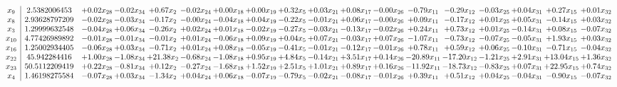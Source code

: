 \documentclass[9pt]{article}
\begin{document}
 \[\begin{array}{c| c c@{\hskip 2pt} c@{\hskip 2pt} c@{\hskip 2pt} c@{\hskip 2pt} c@{\hskip 2pt} c@{\hskip 2pt} c@{\hskip 2pt} c@{\hskip 2pt} c@{\hskip 2pt} c@{\hskip 2pt} c@{\hskip 2pt} c@{\hskip 2pt} c@{\hskip 2pt} c@{\hskip 2pt} c@{\hskip 2pt} c@{\hskip 2pt} }
 x_{9}   &  2.5382006453 & +  0.02 x_{28} & -0.02 x_{34} & +  0.67 x_{2} & -0.02 x_{24} & +  0.00 x_{18} & +  0.00 x_{19} & +  0.32 x_{5} & +  0.03 x_{21} & +  0.08 x_{17} & -0.00 x_{26} & -0.79 x_{11} & -0.29 x_{12} & -0.03 x_{25} & +  0.04 x_{31} & +  0.27 x_{15} & +  0.01 x_{32}\\
 x_{8}   &  2.93628797209 & -0.02 x_{28} & -0.03 x_{34} & -0.17 x_{2} & -0.00 x_{24} & -0.04 x_{18} & +  0.04 x_{19} & -0.22 x_{5} & -0.01 x_{21} & +  0.06 x_{17} & -0.00 x_{26} & +  0.09 x_{11} & -0.17 x_{12} & +  0.01 x_{25} & +  0.05 x_{31} & -0.14 x_{15} & +  0.03 x_{32}\\
 x_{3}   &  1.29999632548 & -0.04 x_{28} & +  0.06 x_{34} & -0.26 x_{2} & +  0.02 x_{24} & +  0.01 x_{18} & -0.02 x_{19} & -0.27 x_{5} & -0.03 x_{21} & -0.13 x_{17} & -0.02 x_{26} & +  0.24 x_{11} & +  0.73 x_{12} & +  0.01 x_{25} & -0.14 x_{31} & +  0.08 x_{15} & -0.07 x_{32}\\
 x_{10}   &  4.77426989892 & -0.01 x_{28} & -0.01 x_{34} & -0.01 x_{2} & +  0.01 x_{24} & -0.06 x_{18} & +  0.09 x_{19} & +  0.04 x_{5} & +  0.07 x_{21} & -0.03 x_{17} & +  0.07 x_{26} & -1.07 x_{11} & -0.73 x_{12} & -0.07 x_{25} & -0.05 x_{31} & +  1.93 x_{15} & +  0.03 x_{32}\\
 x_{16}   &  1.25002934405 & -0.06 x_{28} & +  0.03 x_{34} & -0.71 x_{2} & +  0.01 x_{24} & +  0.08 x_{18} & -0.05 x_{19} & -0.41 x_{5} & -0.01 x_{21} & -0.12 x_{17} & -0.01 x_{26} & +  0.78 x_{11} & +  0.59 x_{12} & +  0.06 x_{25} & -0.10 x_{31} & -0.71 x_{15} & -0.04 x_{32}\\
 x_{22}   &  45.942284416 & +  1.00 x_{28} & -1.08 x_{34} & + 21.38 x_{2} & -0.68 x_{24} & -1.08 x_{18} & +  0.95 x_{19} & +  4.84 x_{5} & -0.14 x_{21} & +  3.51 x_{17} & +  0.14 x_{26} & -20.89 x_{11} & -17.20 x_{12} & -1.21 x_{25} & +  2.91 x_{31} & + 13.04 x_{15} & +  1.36 x_{32}\\
 x_{23}   &  50.5112209419 & +  0.22 x_{28} & -0.81 x_{34} & +  0.12 x_{2} & -0.27 x_{24} & -1.68 x_{18} & +  1.52 x_{19} & +  2.51 x_{5} & +  1.01 x_{21} & +  0.89 x_{17} & +  0.16 x_{26} & -11.92 x_{11} & -18.73 x_{12} & -0.83 x_{25} & +  0.07 x_{31} & + 22.95 x_{15} & +  0.74 x_{32}\\
 x_{4}   &  1.46198275584 & -0.07 x_{28} & +  0.03 x_{34} & -1.34 x_{2} & +  0.04 x_{24} & +  0.06 x_{18} & -0.07 x_{19} & -0.79 x_{5} & -0.02 x_{21} & -0.08 x_{17} & -0.01 x_{26} & +  0.39 x_{11} & +  0.51 x_{12} & +  0.04 x_{25} & -0.04 x_{31} & -0.90 x_{15} & -0.07 x_{32}\\

\end{array}\]
\end{document}
